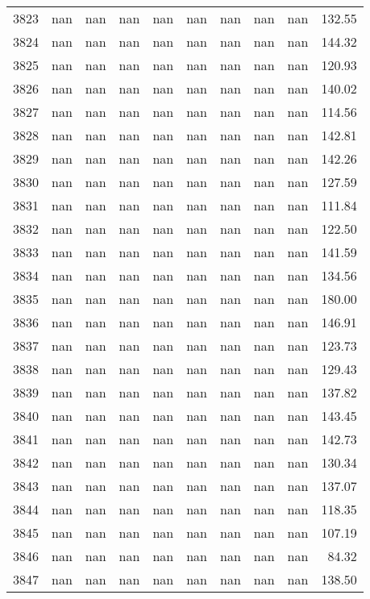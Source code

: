 \begin{tabular}{lrrrrrrrrr}
3823 & nan & nan & nan & nan & nan & nan & nan & nan & 132.55 \\
3824 & nan & nan & nan & nan & nan & nan & nan & nan & 144.32 \\
3825 & nan & nan & nan & nan & nan & nan & nan & nan & 120.93 \\
3826 & nan & nan & nan & nan & nan & nan & nan & nan & 140.02 \\
3827 & nan & nan & nan & nan & nan & nan & nan & nan & 114.56 \\
3828 & nan & nan & nan & nan & nan & nan & nan & nan & 142.81 \\
3829 & nan & nan & nan & nan & nan & nan & nan & nan & 142.26 \\
3830 & nan & nan & nan & nan & nan & nan & nan & nan & 127.59 \\
3831 & nan & nan & nan & nan & nan & nan & nan & nan & 111.84 \\
3832 & nan & nan & nan & nan & nan & nan & nan & nan & 122.50 \\
3833 & nan & nan & nan & nan & nan & nan & nan & nan & 141.59 \\
3834 & nan & nan & nan & nan & nan & nan & nan & nan & 134.56 \\
3835 & nan & nan & nan & nan & nan & nan & nan & nan & 180.00 \\
3836 & nan & nan & nan & nan & nan & nan & nan & nan & 146.91 \\
3837 & nan & nan & nan & nan & nan & nan & nan & nan & 123.73 \\
3838 & nan & nan & nan & nan & nan & nan & nan & nan & 129.43 \\
3839 & nan & nan & nan & nan & nan & nan & nan & nan & 137.82 \\
3840 & nan & nan & nan & nan & nan & nan & nan & nan & 143.45 \\
3841 & nan & nan & nan & nan & nan & nan & nan & nan & 142.73 \\
3842 & nan & nan & nan & nan & nan & nan & nan & nan & 130.34 \\
3843 & nan & nan & nan & nan & nan & nan & nan & nan & 137.07 \\
3844 & nan & nan & nan & nan & nan & nan & nan & nan & 118.35 \\
3845 & nan & nan & nan & nan & nan & nan & nan & nan & 107.19 \\
3846 & nan & nan & nan & nan & nan & nan & nan & nan & 84.32 \\
3847 & nan & nan & nan & nan & nan & nan & nan & nan & 138.50 \\

\end{tabular}
